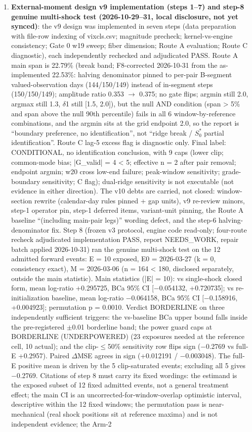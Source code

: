\documentclass[11pt]{article}
\begin{document}
\begin{enumerate}
\item \textbf{External-moment design v9 implementation (steps 1--7) and step-8 genuine multi-shock test (2026-10-29--31, local disclosure, not yet synced)}: the v9 design was implemented in seven steps (data preparation with file-row indexing of vixcls.csv; magnitude precheck; kernel-vs-engine consistency; Gate 0 w19 sweep; fiber dimension; Route A evaluation; Route C diagnostic), each independently rechecked and adjudicated PASS. Route A main span is 22.79\% (break band; F8-corrected 2026-10-31 from the as-implemented 22.53\%: halving denominator pinned to per-pair B-segment valued-observation days (144/150/149) instead of in-segment steps (150/150/149); amplitude ratio 0.353 $\rightarrow$ 0.375; no gate flips; argmin still 2.0, argmax still 1.3, $\delta$1 still [1.5, 2.0]), but the null AND condition (span > 5\% and span above the null 90th percentile) fails in all 6 window-by-reference combinations, and the argmin sits at the grid endpoint 2.0, so the report is “boundary preference, no identification”, not “ridge break / $S_0^*$ partial identification”. Route C lag-5 excess flag is diagnostic only. Final label: CONDITIONAL, no identification conclusion, with 9 caps (lower clip; common-mode bias; |G\_valid| = 4 < 5; effective n = 2 after pair removal; endpoint argmin; w20 cross low-end failure; peak-window sensitivity; grade-boundary sensitivity; C flag); dual-ridge sensitivity is not executable (not evidence in either direction). The v10 debts are carried, not closed: window-section rewrite (calendar-day rules pinned + gap units), v9 re-review minors, step-1 operator pin, step-1 deferred items, variant-unit pinning, the Route A baseline “(including main-pair legs)” wording defect, and the step-6 halving-denominator fix. Step 8 (frozen v3 protocol, engine code read-only; four-route recheck adjudicated implementation PASS, report NEEDS\_WORK, repair batch applied 2026-10-31) ran the genuine multi-shock test on the 12 admitted forward events: E = 10 exposed, E0 = 2026-03-27 (k = 0, consistency exact), M = 2026-03-06 (n = 164 < 180, disclosed separately, outside the main statistic). Main statistics (|E| = 10): vs single-shock closed form, mean log-ratio +0.295725, BCa 95\% CI [$-$0.054132, +0.720735]; vs re-initialization baseline, mean log-ratio $-$0.064158, BCa 95\% CI [$-$0.158916, +0.004923]; permutation p = 0.0010. Verdict BORDERLINE on three independently sufficient triggers: the vs-baseline BCa upper bound falls inside the pre-registered $\pm$0.01 borderline band; the power guard caps at BORDERLINE (UNDERPOWERED) (23 exposures needed at the reference cell, 10 actual); and the clip-$\leq$50\% sensitivity row flips sign ($-$0.2769 vs full-E +0.2957). Paired $\Delta$MSE agrees in sign (+0.012191 / $-$0.003048). The full-E positive mean is driven by the 5 clip-saturated events; excluding all 5 gives $-$0.2769. Citations of step 8 must carry its fixed wordings: the estimand is the exposed subset of 12 fixed admitted events, not a general treatment effect; the main CI is an uncorrected-for-window-overlap optimistic interval, descriptive within the 12 fixed windows; the permutation pass is near-mechanical (real shock positions sit at reference maxima) and is not independent evidence; the Arm-2 
\end{enumerate}
\end{document}
